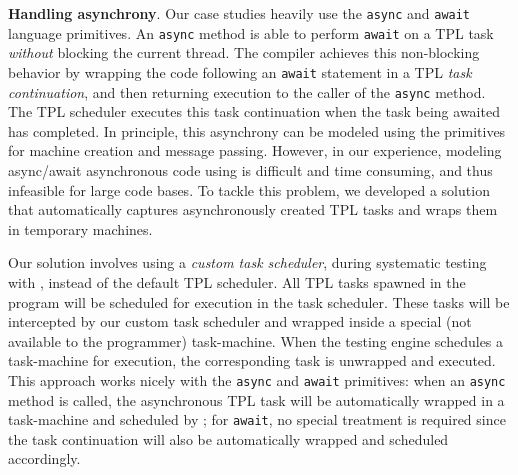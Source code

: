 \textbf{Handling  asynchrony}.
Our case studies heavily use the \texttt{async} and \texttt{await}  language primitives. An \texttt{async} method is able to perform \texttt{await} on a TPL task \emph{without} blocking the current thread. The \csharp compiler achieves this non-blocking behavior by wrapping the code following an \texttt{await} statement in a TPL \emph{task continuation}, and then returning execution to the caller of the \texttt{async} method. The TPL scheduler executes this task continuation when the task being awaited has completed. In principle, this asynchrony can be modeled using the \psharp primitives for machine creation and message passing. However, in our experience, modeling async/await asynchronous code using \psharp is difficult and time consuming, and thus infeasible for large code bases. To tackle this problem, we developed a solution that automatically captures asynchronously created TPL tasks and wraps them in temporary \psharp machines.


Our solution involves using a \emph{custom task scheduler}, during systematic testing with \psharp, instead of the default TPL scheduler.
All TPL tasks spawned in the \psharp program will be scheduled for execution in the \psharp task scheduler. These tasks will be intercepted by our custom task scheduler and wrapped inside a special (not available to the programmer) task-machine. When the \psharp testing engine schedules a task-machine for execution, the corresponding task is unwrapped and executed. This approach works nicely with the \texttt{async} and \texttt{await}  primitives: when an \texttt{async} method is called, the asynchronous TPL task will be automatically wrapped in a task-machine and scheduled by \psharp; for \texttt{await}, no special treatment is required since the task continuation will also be automatically wrapped and scheduled accordingly.
